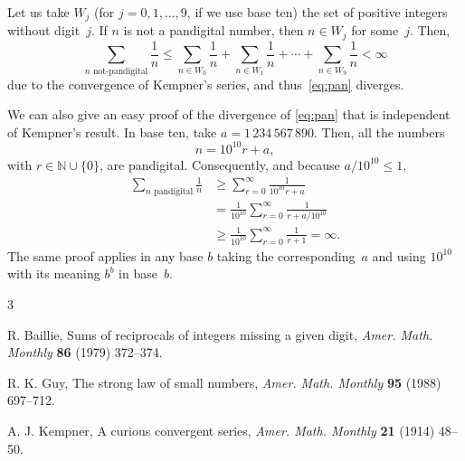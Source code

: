 \documentclass[a4paper]{article}
\begin{document}
Let us take $W_j$ (for $j=0,1,\dots,9$, if we use base ten) the set of 
positive integers without digit~$j$. If $n$ is not a pandigital number,
then $n \in W_j$ for some~$j$. Then,
\[
  \sum_{n \text{ not-pandigital}} \frac{1}{n}
  \le \sum_{n \in W_0} \frac{1}{n} 
  + \sum_{n \in W_1} \frac{1}{n}
  + \cdots
  + \sum_{n \in W_9} \frac{1}{n}
  < \infty
\]
due to the convergence of Kempner's series, and thus~\eqref{eq:pan} diverges.

We can also give an easy proof of the divergence of \eqref{eq:pan} that
is independent of Kempner's result.
In base ten, take $a = 1\,234\,567\,890$. Then, all the numbers 
\[
n = 10^{10}r + a,
\]
with $r \in \mathbb{N} \cup \{0\}$, are pandigital.
Consequently, and because $a/10^{10} \le 1$,
\begin{align*}
  \sum_{n \text{ pandigital}} \frac{1}{n}
  &\ge \sum_{r=0}^{\infty} \frac{1}{10^{10}r + a} \\
  &= \frac{1}{10^{10}} \sum_{r=0}^{\infty} \frac{1}{r + a/10^{10}} \\
  &\ge \frac{1}{10^{10}} \sum_{r=0}^{\infty} \frac{1}{r+1}
  = \infty.
\end{align*}
The same proof applies in any base $b$ taking the corresponding~$a$
and using $10^{10}$ with its meaning $b^b$ in base~$b$.

\begin{thebibliography}{3}

%
%

R. Baillie,  
{Sums of reciprocals of integers missing a given digit}, 
\textit{Amer. Math. Monthly} \textbf{86} (1979) 372--374.

R. K. Guy,  
{The strong law of small numbers}, 
\textit{Amer. Math. Monthly} \textbf{95} (1988) 697--712.

A. J. Kempner,  
{A curious convergent series}, 
\textit{Amer. Math. Monthly} \textbf{21} (1914) 48--50.

\end{thebibliography}
\end{document}
